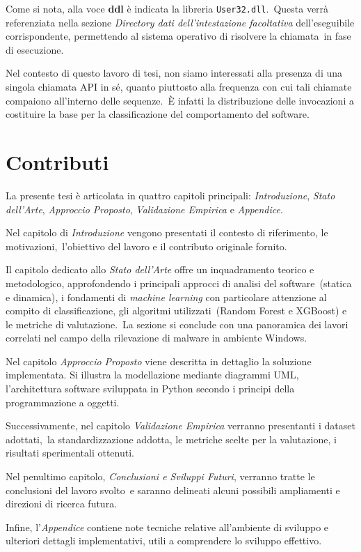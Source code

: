 Come si nota, alla voce \textbf{ddl} è indicata la libreria \texttt{User32.dll}.\
Questa verrà referenziata nella sezione \textit{Directory dati dell’intestazione facoltativa} dell’eseguibile corrispondente, permettendo al sistema operativo di risolvere la chiamata\
in fase di esecuzione.

Nel contesto di questo lavoro di tesi, non siamo interessati alla presenza di una singola chiamata API in sé, quanto piuttosto alla frequenza
con cui tali chiamate compaiono all'interno delle sequenze.\
È infatti la distribuzione delle invocazioni a costituire la base per la classificazione del comportamento del software.

\section{Contributi}

La presente tesi è articolata in quattro capitoli principali: \textit{Introduzione}, \textit{Stato dell'Arte},
\textit{Approccio Proposto}, \textit{Validazione Empirica} e \textit{Appendice}.

Nel capitolo di \textit{Introduzione} vengono presentati il contesto di riferimento, le motivazioni,\
l'obiettivo del lavoro e il contributo originale fornito.

Il capitolo dedicato allo \textit{Stato dell’Arte} offre un inquadramento teorico e metodologico, approfondendo i principali approcci di analisi del software\
(statica e dinamica), i fondamenti di \textit{machine learning} con particolare attenzione al compito di classificazione, gli algoritmi utilizzati\
(Random Forest e XGBoost) e le metriche di valutazione.\
La sezione si conclude con una panoramica dei lavori correlati nel campo della rilevazione di malware in ambiente Windows.

Nel capitolo \textit{Approccio Proposto} viene descritta in dettaglio la soluzione implementata.
Si illustra la modellazione mediante diagrammi UML, l'architettura software sviluppata in Python secondo i principi della programmazione a oggetti.

Successivamente, nel capitolo \textit{Validazione Empirica} verranno presentanti i dataset adottati,\
la standardizzazione addotta, le metriche scelte per la valutazione, i risultati sperimentali ottenuti.

Nel penultimo capitolo, \textit{Conclusioni e Sviluppi Futuri}, verranno tratte le conclusioni del lavoro svolto\
e saranno delineati alcuni possibili ampliamenti e direzioni di ricerca futura.

Infine, l'\textit{Appendice} contiene note tecniche relative all'ambiente di sviluppo e ulteriori dettagli implementativi, utili a
comprendere lo sviluppo effettivo.
